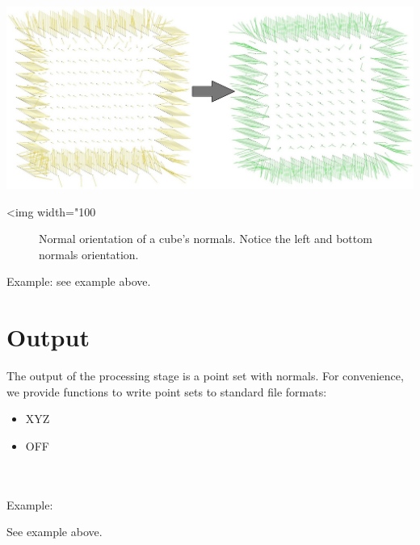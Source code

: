 \begin{center}
    \label{Point_set_processing_3-fig-mst_orient_normals}
    \begin{ccTexOnly}
        \includegraphics[width=1.0\textwidth]{Point_set_processing_3/mst_orient_normals} %
    \end{ccTexOnly}
    \begin{ccHtmlOnly}
        <img width="100%
    \end{ccHtmlOnly}
    \begin{figure}[h]
        \caption{Normal orientation of a cube's normals. Notice the left and bottom normals orientation.}
    \end{figure}
\end{center}

Example: see  example above.


\section{Output}

The output of the processing stage is a point set with normals.
For convenience, we provide functions to write point sets to standard file formats:
\begin{itemize}
\item XYZ
\item OFF
\end{itemize}

  \\
  \\

Example:

See  example above.

